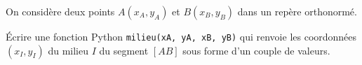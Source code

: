 \begin{exo}
	On considère deux points $A(x_A, y_A)$ et $B(x_B, y_B)$ dans un repère orthonormé.

	Écrire une fonction Python \lstinline|milieu(xA, yA, xB, yB)| qui renvoie les coordonnées $(x_I, y_I)$ du milieu $I$ du segment $[AB]$ sous forme d'un couple de valeurs.
\end{exo}
